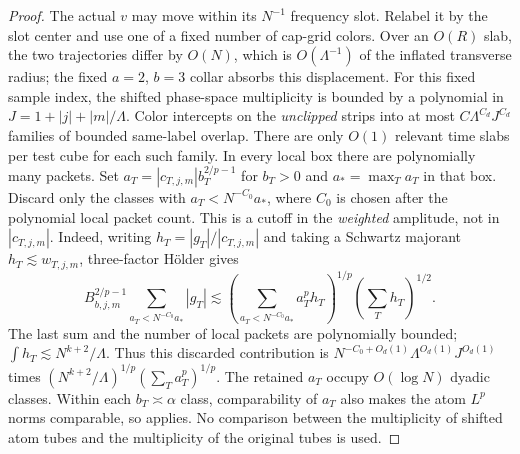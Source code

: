 \begin{proof}
The actual $v$ may move within its $N^{-1}$ frequency slot.  Relabel it
by the slot center and use one of a fixed number of cap-grid colors.
Over an $O(R)$ slab, the two trajectories differ by $O(N)$, which is
$O(\Lambda^{-1})$ of the inflated transverse radius; the fixed
$a=2$, $b=3$ collar absorbs this displacement.  For this fixed sample
index, the shifted phase-space multiplicity is bounded by a polynomial
in $J=1+|j|+|m|/\Lambda$.  Color intercepts on the \emph{unclipped}
strips into at most $C\Lambda^{C_d}J^{C_d}$ families of bounded
same-label overlap.  There are only $O(1)$ relevant time slabs per test
cube for each such family.  In every local box there are polynomially
many packets.  Set $a_T=|c_{T,j,m}|b_T^{2/p-1}$ for $b_T>0$ and
$a_* = \max_T a_T$ in that box.  Discard only the classes with
$a_T<N^{-C_0}a_*$, where $C_0$ is chosen after the polynomial local
packet count.  This is a cutoff in the \emph{weighted} amplitude, not in
$|c_{T,j,m}|$.  Indeed, writing $h_T=|g_T|/|c_{T,j,m}|$ and taking a
Schwartz majorant $h_T\lesssim w_{T,j,m}$, three-factor H\"older gives
\[
 B_{b,j,m}^{2/p-1}\sum_{a_T<N^{-C_0}a_*}|g_T|
 \lesssim
 \left(\sum_{a_T<N^{-C_0}a_*}a_T^ph_T\right)^{1/p}
 \left(\sum_T h_T\right)^{1/2}.
\]
The last sum and the number of local packets are polynomially bounded;
$\int h_T\lesssim N^{k+2}/\Lambda$.  Thus this discarded contribution
is $N^{-C_0+O_d(1)}\Lambda^{O_d(1)}J^{O_d(1)}$ times
$(N^{k+2}/\Lambda)^{1/p}(\sum_Ta_T^p)^{1/p}$.
The retained $a_T$ occupy $O(\log N)$ dyadic classes.  Within each
$b_T\asymp\alpha$ class, comparability of $a_T$ also makes the atom
$L^p$ norms comparable, so  applies.  No
comparison between the multiplicity of shifted atom tubes and the
multiplicity of the original tubes is used.


\end{proof}
